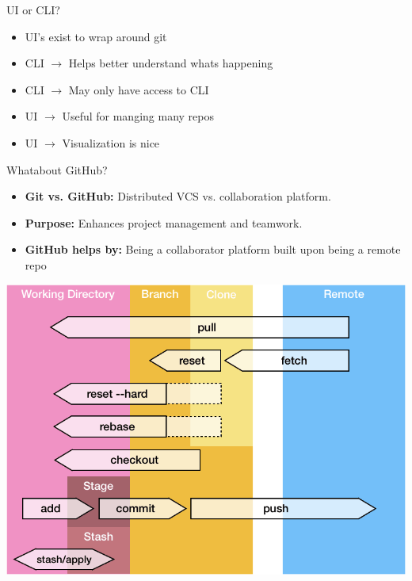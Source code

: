\documentclass[aspectratio=169]{beamer}
\begin{document}
\begin{frame}{UI or CLI?}
    \begin{itemize}
        \item UI's exist to wrap around git
        \item CLI $\rightarrow$ Helps better understand whats happening
        \item CLI $\rightarrow$ May only have access to CLI
        \item UI $\rightarrow$ Useful for manging many repos
        \item UI $\rightarrow$ Visualization is nice 
    \end{itemize}
\end{frame}

\begin{frame}{Whatabout GitHub?}
    \begin{itemize}
        \item \textbf{Git vs. GitHub:} Distributed VCS vs. collaboration platform.
        \item \textbf{Purpose:} Enhances project management and teamwork.
        \item \textbf{GitHub helps by:} Being a collaborator platform built upon being a remote repo
    \end{itemize}
    \begin{center}
        \includegraphics[scale=.25]{git_commands.png}
    \end{center}
\end{frame}
\end{document}
